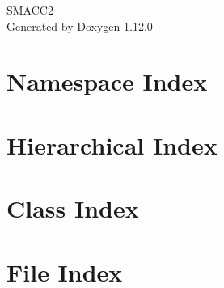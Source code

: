 \documentclass[twoside]{book}
\newcommand{\+}{\discretionary{\mbox{\scriptsize$\hookleftarrow$}}{}{}}
\newcommand{\clearemptydoublepage}{%
    \newpage{\pagestyle{empty}\cleardoublepage}%
  }
\begin{document}
  \raggedbottom
    \hypersetup{pageanchor=false,
                bookmarksnumbered=true,
                pdfencoding=unicode
               }
  \begin{titlepage}
  \vspace*{7cm}
  \begin{center}%
  {\Large SMACC2}\\
  \vspace*{1cm}
  {\large Generated by Doxygen 1.12.0}\\
  \end{center}
  \end{titlepage}
  \clearemptydoublepage
  \tableofcontents
  \clearemptydoublepage
  \hypersetup{pageanchor=true}
\chapter{Namespace Index}

\chapter{Hierarchical Index}

\chapter{Class Index}

\chapter{File Index}

\end{document}
